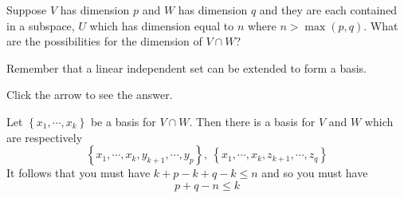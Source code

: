 \documentclass{ximera}
\begin{document}
\begin{problem}\label{prb:5.29} Suppose $V$ has dimension $p$ and $W$ has dimension $q$ and they
are each contained in a subspace, $U$ which has dimension equal to $n$ where
$n>\max \left( p,q\right) .$ What are the possibilities for the dimension of
$V\cap W$? 
\begin{hint}
Remember that a linear independent set can be extended to form a basis.

Click the arrow to see the answer.
\begin{expandable}
Let $\left\{ x_{1},\cdots ,x_{k}\right\} $ be a
basis for $V\cap W.$ Then there is a basis for $V$ and $W$ which are
respectively
\[
\left\{ x_{1},\cdots ,x_{k},y_{k+1},\cdots ,y_{p}\right\} ,\ \left\{
x_{1},\cdots ,x_{k},z_{k+1},\cdots ,z_{q}\right\}
\]
It follows that you must have $k+p-k+q-k\leq n$ and so you must have
\[
p+q-n\leq k
\]
\end{expandable}
\end{hint}
\end{problem}
\end{document}
